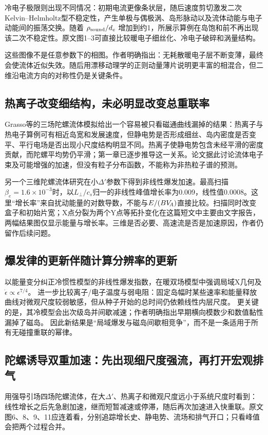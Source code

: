 冷电子极限则出现不同情况：初期电流更像条状层，随后速度剪切激发二次Kelvin--Helmholtz型不稳定性，产生单极与偶极涡、岛形脉动以及流体动能与电子动能间的振荡交换。随着 $\rho_{\rm sound}/d_e$ 增加到约1，所展示算例在岛饱和前不再出现该二次不稳定性。原文图1--3可直接比较暖电子细丝化、冷电子破碎和涡量结构。

这些图像不是任意参数下的相图。作者明确指出：无耗散暖电子层不断变薄，最终会使流体近似失效。随后用漂移动理学的正则动量薄片说明更丰富的相混合，但二维沿电流方向的对称性仍是关键条件。

\subsection{热离子改变细结构，未必明显改变总重联率}
Grasso等的三场陀螺流体模拟给出一个容易被只看磁通曲线漏掉的结果：热离子与热电子算例可有相近岛宽和发展速度，但静电势是否形成细丝、岛内密度是否变平、平行电场是否出现小尺度结构明显不同。热离子使静电势包含未经平滑的密度贡献，而陀螺平均势仍平滑；第一章已逐步推导这一关系。论文据此讨论流体电子束及可能增强的加速，但没有粒子分布函数，不能称为非热粒子谱的预测。\citep{E469}

另一个三维陀螺流体研究在小$\Delta'$参数下得到非线性爆发加速。最高扫描$\beta_e=1.6\times10^{-3}$时，以$L_\perp/c_s$归一的非线性峰值增长率为0.009，线性值0.0008。这里“增长率”来自扰动能量的对数导数，不能与$E/(BV_{\!A})$直接比较。扫描同时改变盒子和初始片宽；X点分裂为两个Y点等拓扑变化在这篇短文中主要由文字报告，两幅结果图仅显示能量与增长率。三维是否必要、高速流是否是加速原因，作者仍留作后续问题。\citep{L184}

\subsection{爆发律的更新伴随计算分辨率的更新}
\citet{L191}以能量变分纠正冷惯性模型的非线性爆发指数，\citet{L214}在暖双场模型中强调局域X几何及$\dot\epsilon\propto\epsilon^{7/4}$。
\citet{F697}进一步比较离子/电子温度与弱电阻：固定岛幅时某些速率和能量释放曲线对微观尺度较弱敏感，但从种子开始的总时间仍依赖线性内层尺度。
更关键的是，其冷模型会出次级岛并间歇减速；作者明确指出早期横向模数少和数值黏性漏掉了磁岛。
因此新结果是“局域爆发与磁岛间歇相竞争”，而不是一条适用于所有无碰撞重联的幂律。

\subsection{陀螺诱导双重加速：先出现细尺度强流，再打开宏观排气}
\citet{F672}用强导引场四场陀螺流体，在大$\Delta'$、热离子和微观尺度远小于系统尺度时看到：线性增长之后先急剧加速，继而短暂减速或停滞，随后再次加速进入快重联。原文图6、8、9、11应连着看，分别追踪增长史、静电势、流场和排气开口；只看峰值会把两个过程合并。

